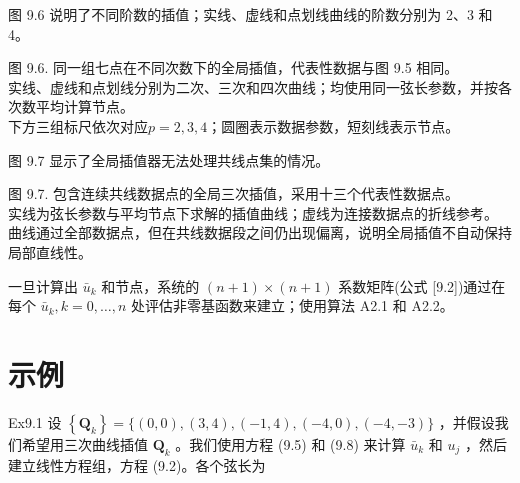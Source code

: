 \documentclass[../main.tex]{subfiles}
\begin{document}
图 9.6 说明了不同阶数的插值；实线、虚线和点划线曲线的阶数分别为 2、3 和 4。

\begin{center}
\begin{minipage}{27cm}
\vspace*{.6\baselineskip}
\centering
{}
\par\smallskip
图 9.6. 同一组七点在不同次数下的全局插值，代表性数据与图 9.5 相同。\\
实线、虚线和点划线分别为二次、三次和四次曲线；均使用同一弦长参数，并按各次数平均计算节点。\\
下方三组标尺依次对应$p=2,3,4$；圆圈表示数据参数，短刻线表示节点。
\end{minipage}
\end{center}

图 9.7 显示了全局插值器无法处理共线点集的情况。

\begin{center}
\begin{minipage}{27cm}
\vspace*{.6\baselineskip}
\centering
{}
\par\smallskip
图 9.7. 包含连续共线数据点的全局三次插值，采用十三个代表性数据点。\\
实线为弦长参数与平均节点下求解的插值曲线；虚线为连接数据点的折线参考。\\
曲线通过全部数据点，但在共线数据段之间仍出现偏离，说明全局插值不自动保持局部直线性。
\end{minipage}
\end{center}



一旦计算出 \({\bar{u}}_{k}\) 和节点，系统的 \(\left( {n + 1}\right)  \times  \left( {n + 1}\right)\) 系数矩阵(公式 [9.2])通过在每个 \({\bar{u}}_{k},k = 0,\ldots ,n\) 处评估非零基函数来建立；使用算法 A2.1 和 A2.2。

\section*{示例}

Ex9.1 设 \(\left\{  {\mathbf{Q}}_{k}\right\}   = \{ \left( {0,0}\right) ,\left( {3,4}\right) ,\left( {-1,4}\right) ,\left( {-4,0}\right) ,\left( {-4, - 3}\right) \}\) ，并假设我们希望用三次曲线插值 \({\mathbf{Q}}_{k}\) 。我们使用方程 (9.5) 和 (9.8) 来计算 \({\bar{u}}_{k}\) 和 \({u}_{j}\) ，然后建立线性方程组，方程 (9.2)。各个弦长为
\end{document}
